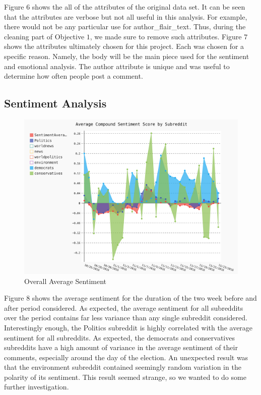 \documentclass[letterpaper]{article}
\begin{document}
Figure $6$ shows the all of the attributes of the original data set. It can be seen that the attributes are verbose but not all useful in this analysis. For example, there would not be any particular use for author\_flair\_text. Thus, during the cleaning part of Objective $1$, we made sure to remove such attributes. Figure $7$ shows the attributes ultimately chosen for this project. Each was chosen for a specific reason. Namely, the body will be the main piece used for the sentiment and emotional analysis. The author attribute is unique and was useful to determine how often people post a comment.


\subsection{Sentiment Analysis}

\begin{figure}[!htb]
\begin{center}
\includegraphics[scale=0.2]{avg-sentiment-stacked.png}
\caption{Overall Average Sentiment}
\label{fig1}
\end{center}
\end{figure}

Figure $8$ shows the average sentiment for the duration of the two week before and after period considered. As expected, the average sentiment for all subreddits over the period contains far less variance than any single subreddit considered. Interestingly enough, the Politics subreddit is highly correlated with the average sentiment for all subreddits. As expected, the democrats and conservatives subreddits have a high amount of variance in the average sentiment of their comments, especially around the day of the election. An unexpected result was that the environment subreddit contained seemingly random variation in the polarity of its sentiment. This result seemed strange, so we wanted to do some further investigation. 
\end{document}
